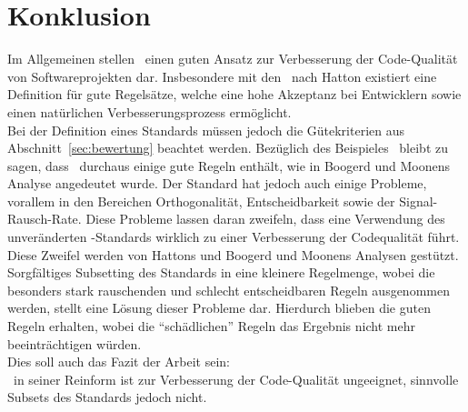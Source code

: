 \documentclass[a4paper,UKenglish,cleveref, autoref]{templates/lipics-v2019}
\begin{document}
    \section{Konklusion}
    \label{sec:konklusion}
    Im Allgemeinen stellen \sqss\ einen guten Ansatz zur Verbesserung der Code-Qualität von Softwareprojekten dar.
    Insbesondere mit den \slss\ nach Hatton existiert eine Definition für gute Regelsätze, welche eine hohe Akzeptanz
    bei Entwicklern sowie einen natürlichen Verbesserungsprozess ermöglicht.\\
    Bei der Definition eines Standards müssen jedoch die Gütekriterien aus Abschnitt~\ref{sec:bewertung} beachtet werden.
    Bezüglich des Beispieles \misra\ bleibt zu sagen, dass \misra\ durchaus einige gute Regeln enthält,
    wie in Boogerd und Moonens Analyse angedeutet wurde.
    Der Standard hat jedoch auch einige Probleme, vorallem in den Bereichen Orthogonalität, Entscheidbarkeit sowie
    der Signal-Rausch-Rate.
    Diese Probleme lassen daran zweifeln, dass eine Verwendung des unveränderten \misra-Standards wirklich zu einer
    Verbesserung der Codequalität führt.
    Diese Zweifel werden von Hattons und Boogerd und Moonens Analysen gestützt.
    Sorgfältiges Subsetting des Standards in eine kleinere Regelmenge, wobei die besonders stark rauschenden und schlecht
    entscheidbaren Regeln ausgenommen werden, stellt eine Lösung dieser Probleme dar.
    Hierdurch blieben die guten Regeln erhalten, wobei die \enquote{schädlichen} Regeln das Ergebnis nicht mehr beeinträchtigen
    würden.\\
    Dies soll auch das Fazit der Arbeit sein:\\
    \misra\ in seiner Reinform ist zur Verbesserung der Code-Qualität ungeeignet, sinnvolle Subsets des Standards jedoch nicht.



    
\end{document}
